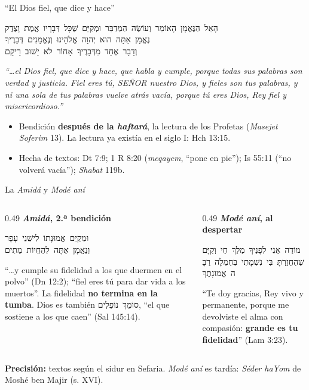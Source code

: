 \documentclass[hyperref={bookmarks=false},aspectratio=169]{beamer}
\let\raggedright\justifying
\newcommand{\heb}[1]{\mbox{\foreignlanguage{hebrew}{#1}}}
\newcommand{\SENOR}{S{\fontsize{0.78em}{1em}\selectfont EÑOR}}
\newcommand{\destacar}[1]{\textbf{\textcolor{azul}{#1}}}
\newcommand{\precision}[1]{{\footnotesize\color{gris}\textbf{Precisión:} #1}}
\begin{document}
\begin{frame}{``El Dios fiel, que dice y hace''}
\begin{center}\small
\heb{הָאֵל הַנֶּאֱמָן הָאוֹמֵר וְעוֹשֶׂה הַמְדַבֵּר וּמְקַיֵּם שֶׁכָּל דְּבָרָיו אֱמֶת וָצֶדֶק}\\[1pt]
\heb{נֶאֱמָן אַתָּה הוּא יְהוָה אֱלֹהֵינוּ וְנֶאֱמָנִים דְּבָרֶיךָ}\\[1pt]
\heb{וְדָבָר אֶחָד מִדְּבָרֶיךָ אָחוֹר לֹא יָשׁוּב רֵיקָם}
\end{center}
\scriptsize\itshape ``\ldots{}el Dios fiel, que dice y hace, que habla y cumple, porque todas sus palabras son verdad y justicia. Fiel eres tú, \SENOR{} nuestro Dios, y fieles son tus palabras, y ni una sola de tus palabras vuelve atrás vacía, porque tú eres Dios, Rey fiel y misericordioso.''\upshape\par\smallskip
\small
\begin{itemize}
\item Bendición \destacar{después de la \emph{haftará}}, la lectura de los Profetas (\emph{Masejet Soferim} 13). La lectura ya existía en el siglo I: Hch 13:15.
\item Hecha de textos: Dt 7:9; 1 R 8:20 (\emph{meqayem}, ``pone en pie''); Is 55:11 (``no volverá vacía''); \emph{Shabat} 119b.
\end{itemize}
\end{frame}

\begin{frame}{La \emph{Amidá} y \emph{Modé aní}}
\begin{columns}[t,onlytextwidth]
\begin{column}{0.49\textwidth}
\textbf{\small\textcolor{azul}{\emph{Amidá}, 2.ª bendición}}\par\smallskip
\centering\heb{וּמְקַיֵּם אֱמוּנָתוֹ לִישֵׁנֵי עָפָר}\\
\heb{וְנֶאֱמָן אַתָּה לְהַחֲיוֹת מֵתִים}\par\smallskip
\raggedright\scriptsize ``\ldots{}y cumple su fidelidad a los que duermen en el polvo'' (Dn 12:2); ``fiel eres tú para dar vida a los muertos''. La fidelidad \destacar{no termina en la tumba}. Dios es también \heb{סוֹמֵךְ נוֹפְלִים}, ``el que sostiene a los que caen'' (Sal 145:14).
\end{column}
\begin{column}{0.49\textwidth}
\textbf{\small\textcolor{azul}{\emph{Modé aní}, al despertar}}\par\smallskip
\centering\heb{מוֹדֶה אֲנִי לְפָנֶיךָ מֶלֶךְ חַי וְקַיָּם}\\
\heb{שֶׁהֶחֱזַרְתָּ בִּי נִשְׁמָתִי בְּחֶמְלָה רַבָּה אֱמוּנָתֶךָ}\par\smallskip
\raggedright\scriptsize ``Te doy gracias, Rey vivo y permanente, porque me devolviste el alma con compasión: \destacar{grande es tu fidelidad}'' (Lam 3:23).
\end{column}
\end{columns}\par\medskip
\precision{textos según el sidur en Sefaria. \emph{Modé aní} es tardía: \emph{Séder haYom} de Moshé ben Majir (s. XVI).}
\end{frame}
\end{document}
